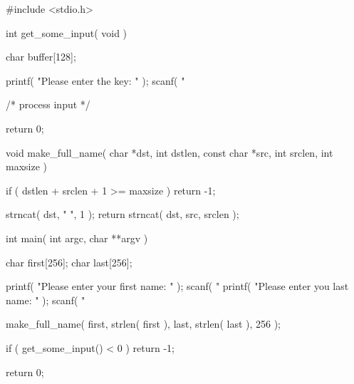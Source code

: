 \documentclass[svv,addpoints]{miunexam}
\begin{document}
\begin{questions}
  \begin{src}[float,caption={Some vulnerable C code.},label={lst:overrun}]
#include <stdio.h>

int
get_some_input( void )
{
  char buffer[128];

  printf( "Please enter the key: " );
  scanf( "%

  /* process input */

  return 0;
}

void
make_full_name( char *dst, int dstlen,
                const char *src, int srclen,
                int maxsize )
{
  if ( dstlen + srclen + 1 >= maxsize )
    return -1;

  strncat( dst, " ", 1 );
  return strncat( dst, src, srclen );
}

int
main( int argc, char **argv )
{
  char first[256];
  char last[256];

  printf( "Please enter your first name: " );
  scanf( "%
  printf( "Please enter you last name: " );
  scanf( "%

  make_full_name( first, strlen( first ),
                  last, strlen( last ), 256 );

  if ( get_some_input() < 0 )
    return -1;

  return 0;
}
  \end{src}

\end{questions}


\printbibliography
\end{document}
